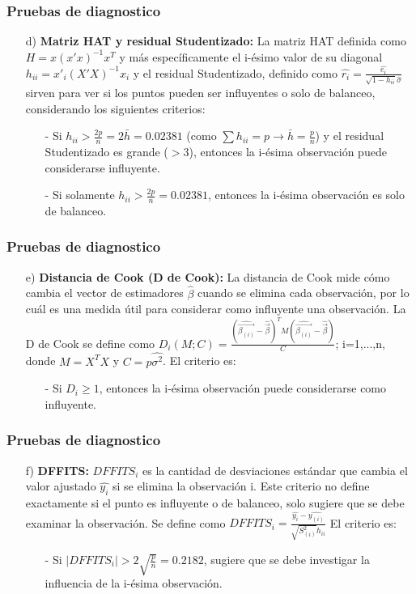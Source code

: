 \documentclass[12pt]{beamer}
\begin{document}
\begin{frame}
\frametitle{Pruebas de diagnostico}
\begin{itemize}
\item[d)] \textbf{Matriz HAT y residual Studentizado:} La matriz HAT definida como $H=x(x'x)^{-1}x^{T}$ y más específicamente el i-ésimo valor de su diagonal $h_{ii}=x'_{i}(X'X)^{-1}x_{i}$ y el residual Studentizado, definido como $\hat{r_{i}}=\frac{\hat{e_{i}}}{\sqrt{1-h_{ii}}\hat{\sigma}}$ sirven para ver si los puntos pueden ser influyentes o solo de balanceo, considerando los siguientes criterios:
\begin{itemize}
\item[-] Si $h_{ii}>\frac{2p}{n}=2\bar{h}=0.02381$ (como $\sum h_{ii}=p \rightarrow \bar{h}=\frac{p}{n}$) y el residual Studentizado es grande ($>3$), entonces la i-ésima observación puede considerarse influyente.
\item[-] Si solamente $h_{ii}>\frac{2p}{n}=0.02381$, entonces la i-ésima observación es solo de balanceo.
\end{itemize}
\end{itemize}
\end{frame}

\begin{frame}
\frametitle{Pruebas de diagnostico}
\begin{itemize}
\item[e)] \textbf{Distancia de Cook (D de Cook):} La distancia de Cook mide cómo cambia el vector de estimadores $\hat{\beta}$ cuando se elimina cada observación, por lo cuál es una medida útil para considerar como influyente una observación. La D de Cook se define como $D_{i}(M;C)=\frac{(\hat{\vec{\beta_{(i)}}}-\hat{\vec{\beta}})^T M(\hat{\vec{\beta_{(i)}}}-\hat{\vec{\beta}})}{C}$; i=1,...,n, donde $M=X^{T}X$ y $C=p\hat{\sigma^2}$. El criterio es:
\begin{itemize}
\item[-] Si $D_{i}\geq 1$, entonces la i-ésima observación puede considerarse como influyente.
\end{itemize}
\end{itemize}
\end{frame}

\begin{frame}
\frametitle{Pruebas de diagnostico}
\begin{itemize}
\item[f)] \textbf{DFFITS:} $DFFITS_{i}$ es la cantidad de desviaciones estándar que cambia el valor ajustado $\hat{y_{i}}$ si se elimina la observación i. Este criterio no define exactamente si el punto es influyente o de balanceo, solo sugiere que se debe examinar la observación. Se define como $DFFITS_{i}=\frac{\hat{y_{i}}-\hat{y_{(i)}}}{\sqrt{S^2_{(i)}}h_{ii}}$ El criterio es:
\begin{itemize}
\item[-] Si $|DFFITS_{i}|>2\sqrt{\frac{p}{n}}=0.2182$, sugiere que se debe investigar la influencia de la i-ésima observación.
\end{itemize}
\end{itemize}
\end{frame}
\end{document}

